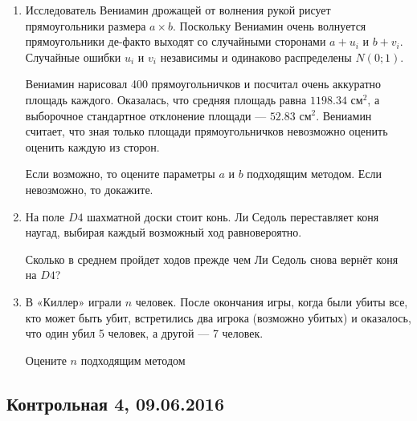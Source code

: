 \documentclass[12pt, a4paper]{article}\usepackage[]{graphicx}\usepackage[]{color}
\begin{document}
\begin{enumerate}
							\item  Исследователь Вениамин дрожащей от волнения рукой рисует прямоугольники размера $a\times b$. Поскольку Вениамин очень волнуется прямоугольники де-факто выходят со случайными сторонами $a+u_i$ и $b+v_i$. Случайные ошибки $u_i$ и $v_i$ независимы и одинаково распределены $N(0;1)$.




							Вениамин нарисовал 400 прямоугольничков и посчитал очень аккуратно площадь каждого. Оказалась, что средняя площадь равна $1198.34$ см$^2$, а выборочное стандартное отклонение площади — $52.83$ см$^2$. Вениамин считает, что зная только площади прямоугольничков невозможно оценить оценить каждую из сторон.

							Если возможно, то оцените параметры $a$ и $b$ подходящим методом. Если невозможно, то докажите.


							\item На поле $D4$ шахматной доски стоит конь. Ли Седоль переставляет коня наугад, выбирая каждый возможный ход равновероятно.

							Сколько в среднем пройдет ходов прежде чем Ли Седоль снова вернёт коня на $D4$?



							\item В «Киллер» играли $n$ человек. После окончания игры, когда были убиты все, кто может быть убит, встретились два игрока (возможно убитых) и оказалось, что один убил 5 человек, а другой — 7 человек.

							Оцените $n$ подходящим методом
						\end{enumerate}


						\subsection{Контрольная 4, 09.06.2016}
\end{document}
